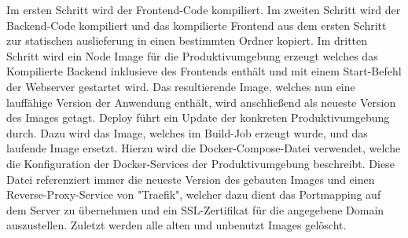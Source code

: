 Im ersten Schritt wird der Frontend-Code kompiliert. Im zweiten Schritt wird der Backend-Code kompiliert und das kompilierte Frontend aus dem ersten Schritt zur statischen auslieferung in einen bestimmten Ordner kopiert. Im dritten Schritt wird ein Node Image für die Produktivumgebung erzeugt welches das Kompilierte Backend inklusieve des Frontends enthält und mit einem Start-Befehl der Webserver gestartet wird.
Das resultierende Image, welches nun eine lauffähige Version der Anwendung enthält, wird anschließend als neueste Version des Images getagt.
Deploy führt ein Update der konkreten Produktivumgebung durch. Dazu wird das Image, welches im Build-Job erzeugt wurde, und das laufende Image ersetzt. Hierzu wird die Docker-Compose-Datei verwendet, welche die Konfiguration der Docker-Services der Produktivumgebung beschreibt. Diese Datei referenziert immer die neueste Version des gebauten Images und einen Reverse-Proxy-Service von "Traefik", welcher dazu dient das Portmapping auf dem Server zu übernehmen und ein SSL-Zertifikat für die angegebene Domain auszustellen.
Zuletzt werden alle alten und unbenutzt Images gelöscht.